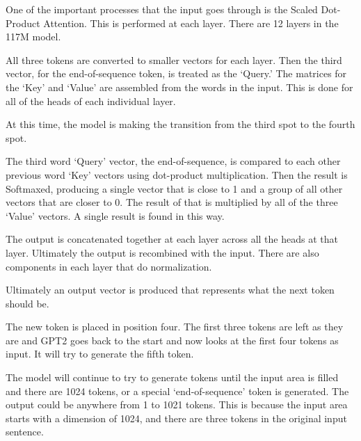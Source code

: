 One of the important processes that the input goes through is the Scaled Dot-Product Attention. This is performed at each layer. There are 12 layers in the 117M model.

All three tokens are converted to smaller vectors for each layer. Then the third vector, for the end-of-sequence token, is treated as the `Query.' The matrices for the `Key' and `Value' are assembled from the words in the input. This is done for all of the heads of each individual layer.

At this time, the model is making the transition from the third spot to the fourth spot.

The third word `Query' vector, the end-of-sequence, is compared to each other previous word `Key' vectors using dot-product multiplication. Then the result is Softmaxed, producing a single vector that is close to 1 and a group of all other vectors that are closer to 0. The result of that is multiplied by all of the three `Value' vectors. A single result is found in this way.

The output is concatenated together at each layer across all the heads at that layer. Ultimately the output is recombined with the input. There are also components in each layer that do normalization.

Ultimately an output vector is produced that represents what the next token should be. %


The new token is placed in position four. The first three tokens are left as they are and GPT2 goes back to the start and now looks at the first four tokens as input. It will try to generate the fifth token.

The model will continue to try to generate tokens until the input area is filled and there are 1024 tokens, or a special `end-of-sequence' token is generated. The output could be anywhere from 1 to 1021 tokens. This is because the input area starts with a dimension of 1024, and there are three tokens in the original input sentence.


